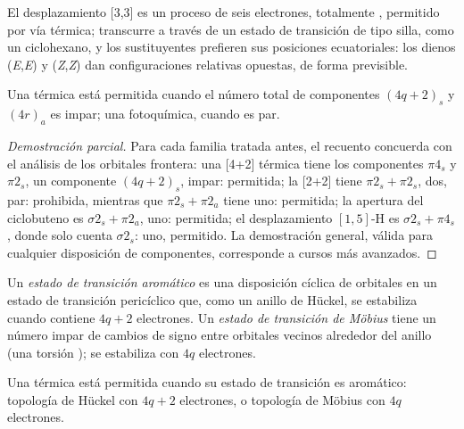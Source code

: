 El desplazamiento [3,3] es un proceso de seis electrones, totalmente , permitido por vía térmica;
transcurre a través de un estado de transición de tipo silla, como un ciclohexano, y
los sustituyentes prefieren sus posiciones ecuatoriales: los dienos (\textit{E},\textit{E}) y (\textit{Z},\textit{Z}) dan
configuraciones relativas opuestas, de forma previsible.

\begin{theorem}\label{thm:b3:pericyclic:woodward-hoffmann}
Una  térmica está permitida cuando el número total de componentes $(4q + 2)_s$ y
$(4r)_a$ es impar; una fotoquímica, cuando es par.
\end{theorem}

\begin{proof}[Demostración parcial]
Para cada familia tratada antes, el recuento concuerda con el análisis de los orbitales
frontera: una  [4+2] térmica tiene los componentes $\pi4_s$ y $\pi2_s$, un componente $(4q + 2)_s$,
impar: permitida; la [2+2] tiene $\pi2_s + \pi2_s$, dos, par: prohibida, mientras que
$\pi2_s + \pi2_a$ tiene uno: permitida; la apertura  del ciclobuteno es $\sigma2_s + \pi2_a$, uno:
permitida; el desplazamiento $[1,5]$-H  es $\sigma2_s + \pi4_s$, donde solo cuenta $\sigma2_s$: uno,
permitido. La demostración general, válida para cualquier disposición de componentes, corresponde
a cursos más avanzados.
\end{proof}

\begin{definition}\label{def:b3:pericyclic:mobius}
Un \emph{estado de transición aromático} es una disposición
cíclica de orbitales en un estado de transición pericíclico que, como un anillo de Hückel, se
estabiliza cuando contiene $4q + 2$ electrones. Un \emph{estado de transición de
Möbius} tiene un número impar de cambios de signo entre
orbitales vecinos alrededor del anillo (una torsión ); se
estabiliza con $4q$ electrones.
\end{definition}

\begin{proposition}\label{prop:b3:pericyclic:aromatic-ts}
Una  térmica está permitida cuando su estado de transición es aromático:
topología de Hückel con $4q + 2$ electrones, o topología de Möbius con $4q$ electrones.
\end{proposition}

